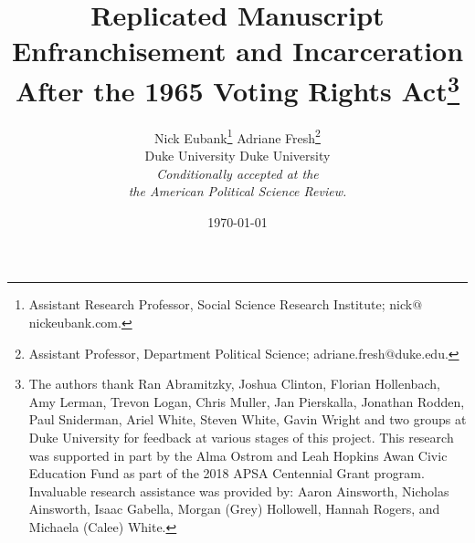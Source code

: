 \documentclass[12pt]{article}
\begin{document}
\onehalfspacing
\setlength{\parindent}{0.0in}
\setlength{\parskip}{.125in}


\title{Replicated Manuscript \\ Enfranchisement and Incarceration \\ After the 1965 Voting Rights Act\footnote{\footnotesize The authors thank Ran Abramitzky, Joshua Clinton, Florian Hollenbach, Amy Lerman, Trevon Logan, Chris Muller, Jan Pierskalla, Jonathan Rodden, Paul Sniderman, Ariel White, Steven White, Gavin Wright and two groups at Duke University for feedback at various stages of this project.  This research was supported in part by the Alma Ostrom and Leah Hopkins Awan Civic Education Fund as part of the 2018 APSA Centennial Grant program.  Invaluable research assistance was provided by: Aaron Ainsworth, Nicholas Ainsworth, Isaac Gabella, Morgan (Grey) Hollowell, Hannah Rogers, and Michaela (Calee) White. }}

\author{\vspace*{.2in} \hspace*{.1in} Nick Eubank\footnote{\footnotesize Assistant Research Professor, Social Science Research Institute; nick$@$nickeubank.com. } \hspace*{.6in}   Adriane Fresh\footnote{\footnotesize Assistant Professor, Department Political Science; adriane.fresh$@$duke.edu. } \\ \vspace*{-.12in} \hspace*{.1in} Duke University  \hspace*{.45in}  Duke University \\ \vspace*{.3in} \large \emph{Conditionally accepted at the}  \\ \vspace*{-.03in} \emph{the American Political Science Review.} \vspace*{.2in} }

\date{\today }


\maketitle




\end{document}
